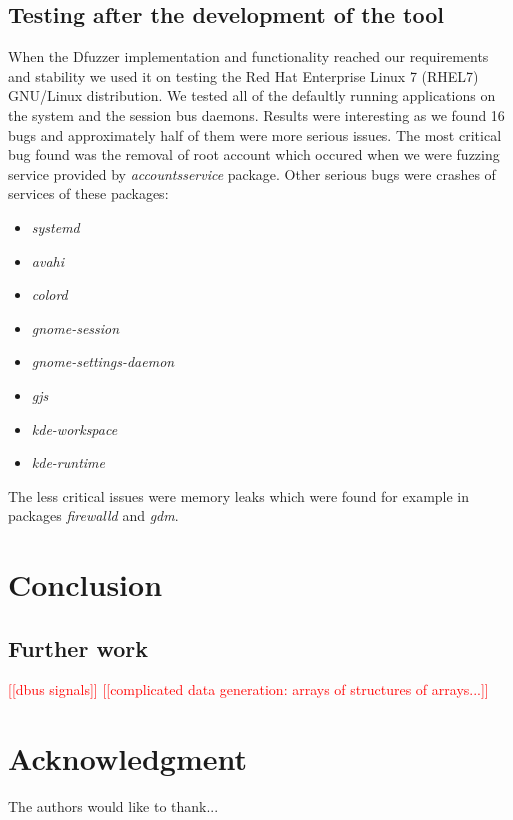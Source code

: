 \documentclass[conference]{IEEEtran}
\newcommand{\addtodo}[1]{\textcolor{red}{[[#1]]}}
\begin{document}
\subsection{Testing after the development of the tool}
When the Dfuzzer implementation and functionality reached our requirements
and stability we used it on testing the Red Hat Enterprise Linux 7 (RHEL7)
GNU/Linux distribution. We tested all of the defaultly running applications
on the system and the session bus daemons. Results were interesting as we found
16 bugs and approximately half of them were more serious issues. The most
critical bug found was the removal of root account which occured when we were
fuzzing service provided by \emph{accountsservice} package. Other serious bugs
were crashes of services of these packages:
\begin{itemize}
	\item \emph{systemd}
	\item \emph{avahi}
	\item \emph{colord}
	\item \emph{gnome-session}
	\item \emph{gnome-settings-daemon}
	\item \emph{gjs}
	\item \emph{kde-workspace}
	\item \emph{kde-runtime}
\end{itemize}
The less critical issues were memory leaks which were found for example in packages
\emph{firewalld} and \emph{gdm}.


\section{Conclusion}
\subsection{Further work}
\addtodo{dbus signals}
\addtodo{complicated data generation: arrays of structures of arrays...}

\section*{Acknowledgment}

The authors would like to thank...


\end{document}
